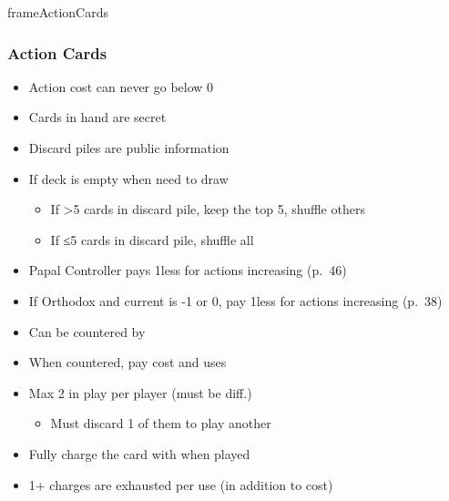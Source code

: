 \documentclass[10pt]{article}
\newlength{\fhActionCards} \setlength\fhActionCards{15\baselineskip}
\begin{document}
\begin{dynamiccontents*}{frameActionCards}\begin{eubox}{\fhActionCards}
	\begin{multicols}{2}
		\subsubsection*{Action Cards }
		\begin{itemize}
			\item Action cost can never go below 0
			\item Cards in hand are secret
			\item Discard piles are public information
			\item If deck is empty when need to draw 
			\begin{itemize}
				\item If >5 cards in discard pile, keep the top 5, shuffle others
				\item If ≤5 cards in discard pile, shuffle all
			\end{itemize}
			\item Papal Controller pays 1\adminpower less for actions increasing \stability (p.~46)
			\item If Orthodox and current \stability is -1 or 0, pay 1\adminpower less for actions increasing \stability (p.~38)
		\end{itemize}
		\begin{itemize}
			\item Can be countered by 
			\item When countered, pay cost and \displaycard uses 
		\end{itemize}
		\begin{itemize}
			\item Max 2 in play per player (must be diff.)
			\begin{itemize}
				\item Must discard 1 of them to play another
			\end{itemize}
			\item Fully charge the card with \cubes when played
			\item 1+ charges are exhausted per use (in addition to \monarchpower cost)
		\end{itemize}
		\begin{itemize}

\end{itemize}
\end{multicols}
\end{eubox}
\end{dynamiccontents*}
\end{document}
